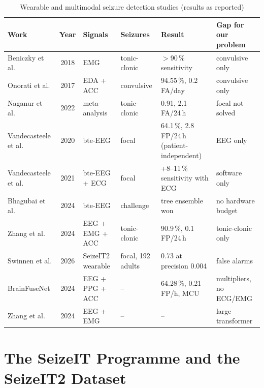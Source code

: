 \begin{table}[H]
\centering\small
\caption{Wearable and multimodal seizure detection studies (results as reported)}\label{tab:lit-wearable}
\begin{tabularx}{\textwidth}{|P{30mm}|c|P{22mm}|P{22mm}|L|L|}
\toprule
\textbf{Work} & \textbf{Year} & \textbf{Signals} & \textbf{Seizures} & \textbf{Result} & \textbf{Gap for our problem}\\
\midrule
Beniczky et al. \cite{beniczky2018emg} & 2018 & EMG & tonic-clonic & $>$90\,\% sensitivity & convulsive only\\ \hline
Onorati et al. \cite{onorati2017empatica} & 2017 & EDA + ACC & convulsive & 94.55\,\%, 0.2 FA/day & convulsive only\\ \hline
Naganur et al. \cite{naganur2022meta} & 2022 & meta-analysis & tonic-clonic & 0.91, 2.1 FA/24\,h & focal not solved\\ \hline
Vandecasteele et al. \cite{vandecasteele2020bte} & 2020 & bte-EEG & focal & 64.1\,\%, 2.8 FP/24\,h (patient-independent) & EEG only\\ \hline
Vandecasteele et al. \cite{vandecasteele2021ecg} & 2021 & bte-EEG + ECG & focal & +8--11\,\% sensitivity with ECG & software only\\ \hline
Bhagubai et al. \cite{bhagubai2024challenge} & 2024 & bte-EEG & challenge & tree ensemble won & no hardware budget\\ \hline
Zhang et al. \cite{zhang2024tcs} & 2024 & EEG + EMG + ACC & tonic-clonic & 90.9\,\%, 0.1 FP/24\,h & tonic-clonic only\\ \hline
Swinnen et al. \cite{swinnen2026seizeit2} & 2026 & SeizeIT2 wearable & focal, 192 adults & 0.73 at precision 0.004 & false alarms\\ \hline
BrainFuseNet \cite{ingolfsson2024brainfusenet} & 2024 & EEG + PPG + ACC & -- & 64.28\,\%, 0.21 FP/h, MCU & multipliers, no ECG/EMG\\ \hline
Zhang et al. \cite{zhang2024cyclic} & 2024 & EEG + EMG & -- & -- & large transformer\\ \hline

\end{tabularx}
\end{table}

\section{The SeizeIT Programme and the SeizeIT2 Dataset}\label{sec:lit-seizeit}

